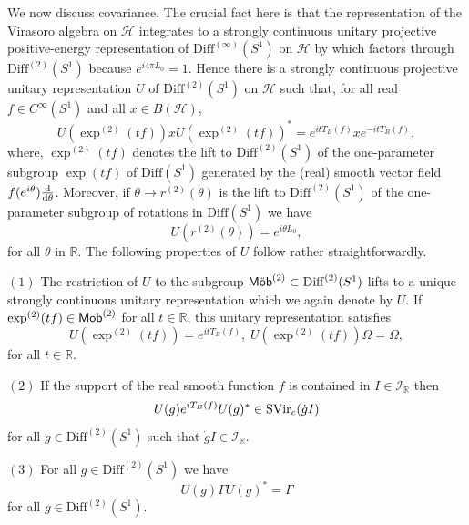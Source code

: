 \documentclass[11pt]{article}
\def\g{\gamma}
\def\I{{\cal I}}
\def\H{{\cal H}}
\def\Diff{{\rm Diff}}
\def\Mob{{\rm\textsf{M\"ob}}}
\def\Diff{{\mathrm {Diff}}}
\def\RR{{\mathbb R}}
\def\H{{\mathcal H}}
\def\I{{\mathcal I}}
\begin{document}
We now discuss covariance. The crucial fact here is that the representation 
of the Virasoro algebra on $\H$ integrates to a strongly continuous 
unitary projective positive-energy representation of $\Diff^{(\infty)}(S^1)$ 
on $\H$ by \cite{GoWa,Tol99} which factors through $\Diff^{(2)}(S^1)$ because
$e^{i4\pi L_0}=1$. Hence there is a strongly continuous projective 
unitary representation $U$ of $\Diff^{(2)}(S^1)$ on $\H$ such that, 
for all real $f \in C^\infty(S^1)$ and all $x \in B(\H)$,  
\begin{equation}
U(\exp^{(2)}(tf))xU(\exp^{(2)}(tf))^*= 
e^{itT_B(f)}xe^{-itT_B(f)}, 
\end{equation}
where, $\exp^{(2)}(tf)$ denotes the lift to $\Diff^{(2)}(S^1)$ of the
one-parameter subgroup $\exp(tf)$ of $\Diff(S^1)$ generated by the 
(real) smooth vector field $f(e^{i\theta})\frac{{\rm d}}{{\rm d}\theta}$. Moreover, 
if $\theta \to r^{(2)}(\theta)$ is the lift to $\Diff^{(2)}(S^1)$ of the 
one-parameter subgroup of rotations in $\Diff(S^1)$ we have  
\begin{equation}
U(r^{(2)}(\theta))= e^{i\theta L_0},
\end{equation}
for all $\theta$ in $\RR$. 
The following properties of $U$ follow rather straightforwardly. 
\medskip

\noindent $(1)$ The restriction of $U$ to the subgroup 
$\Mob^{(2)} \subset \Diff^{(2)}(S^1)$ lifts to a unique strongly continuous 
unitary representation which we again denote by $U$. 
If $\exp^{(2)}(tf) \in \Mob^{(2)}$ for all $t\in \RR$, this 
unitary representation satisfies 
\begin{equation}
U(\exp^{(2)}(tf))=e^{itT_B(f)},\; U(\exp^{(2)}(tf))\Omega=\Omega,
\end{equation}
for all $t\in \RR$.   

\medskip

\noindent $(2)$  If the support of the real smooth function $f$ is contained 
in $I \in \I_\RR$ then 
\begin{equation}
\label{covTB}
U(g)e^{iT_B(f)}U(g)^*\in {\rm SVir}_c(\dot{g}I)
\end{equation}
for all $g \in \Diff^{(2)}(S^1)$ such that $\dot{g}I \in \I_\RR$. 
\medskip

\noindent $(3)$ For all $g \in \Diff^{(2)}(S^1)$ we have 
\begin{equation}
U(g)\Gamma U(g)^* = \Gamma
\end{equation}
for all $g \in \Diff^{(2)}(S^1)$.

\medskip
\end{document}
